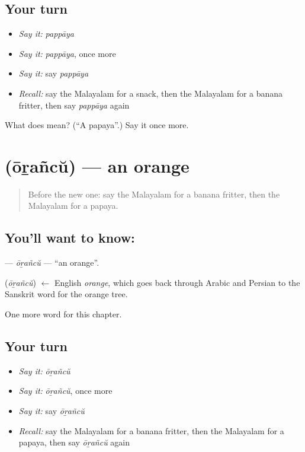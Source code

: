 \subsection*{Your turn}
\begin{itemize}
\raggedright
  \item \emph{Say it:} \emph{pappāya}
  \item \emph{Say it:} \emph{pappāya}, once more
  \item \emph{Say it:} say \emph{pappāya}
  \item \emph{Recall:} say the Malayalam for a snack, then the Malayalam for a banana fritter, then say \emph{pappāya} again
\end{itemize}

\begin{tcolorbox}[breakable,colback=teal!4,colframe=teal!35!black,title={Before you move on}]
What does  mean? (\textquotedblleft{}A papaya\textquotedblright{}.) Say it once more.
\end{tcolorbox}
\section[\texorpdfstring{\ml{ഓറഞ്ച്} (ōṟañcŭ)}{ഓറഞ്ച് (ōṟañcŭ)}]{ (ōṟañcŭ) — an orange}

\label{lesson:ML-C287-orancu}



\begin{quote}
Before the new one: say the Malayalam for a banana fritter, then the Malayalam for a papaya.
\end{quote}

\subsection*{You'll want to know: }
\textbf{} — \emph{ōṟañcŭ} — \textquotedblleft{}an orange\textquotedblright{}.

\begin{cousinweb}
\textbf{} (\emph{ōṟañcŭ}) $\leftarrow$ English \emph{orange}, which goes back through Arabic and Persian to the Sanskrit word for the orange tree.
\end{cousinweb}

\begin{grammarlens}[title={What you've built}]
One more word for this chapter.
\end{grammarlens}

\subsection*{Your turn}
\begin{itemize}
\raggedright
  \item \emph{Say it:} \emph{ōṟañcŭ}
  \item \emph{Say it:} \emph{ōṟañcŭ}, once more
  \item \emph{Say it:} say \emph{ōṟañcŭ}
  \item \emph{Recall:} say the Malayalam for a banana fritter, then the Malayalam for a papaya, then say \emph{ōṟañcŭ} again
\end{itemize}

